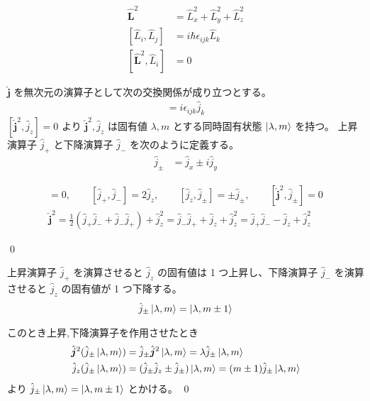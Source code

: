 \documentclass[uplatex,dvipdfmx,a4paper,11pt]{jlreq}
\makeatletter
\theoremstyle{definition}
\renewenvironment{proof}[1][\proofname]{\par
  \normalfont
  \topsep6\p@\@plus6\p@ \trivlist
  \item[\hskip\labelsep{\bfseries #1}\@addpunct{\bfseries}]\ignorespaces\quad\par
}{%
  \qed\endtrivlist\@endpefalse
}
\renewcommand\proofname{証明}
\makeatother
\begin{document}
\begin{proposition}
  \begin{align}
    \hat{\bm{L}}^2              & = \hat{L}_x^2 + \hat{L}_y^2 + \hat{L}_z^2 \\
    [\hat{L}_i, \hat{L}_j]      & = i\hbar\epsilon_{ijk}\hat{L}_k           \\
    [\hat{\bm{L}}^2, \hat{L}_i] & = 0
  \end{align}
\end{proposition}

\begin{definition}
  $\hat{\bm{j}}$ を無次元の演算子として次の交換関係が成り立つとする。
  \begin{align}
    [\hat{j}_i, \hat{j}_j] = i\epsilon_{ijk}\hat{j}_k
  \end{align}
  $[\hat{\bm{j}}^2, \hat{j}_z] = 0$ より $\hat{\bm{j}}^2, \hat{j}_z$ は固有値 $\lambda, m$ とする同時固有状態 $\ket{\lambda, m}$ を持つ。
  上昇演算子 $\hat{j}_+$ と下降演算子 $\hat{j}_-$ を次のように定義する。
  \begin{align}
    \hat{j}_\pm & = \hat{j}_x \pm i\hat{j}_y
  \end{align}
\end{definition}

\begin{proposition}
  \begin{align}
    [\hat{\bm{j}}^2, \hat{j}_z] = 0, \qquad [\hat{j}_+, \hat{j}_-] = 2\hat{j}_z, \qquad [\hat{j}_z, \hat{j}_\pm] = \pm \hat{j}_\pm, \qquad [\hat{\bm{j}}^2, \hat{j}_\pm] = 0 \\
    \hat{\bm{j}}^2 = \frac{1}{2}(\hat{j}_+\hat{j}_- + \hat{j}_-\hat{j}_+) + \hat{j}_z^2 = \hat{j}_-\hat{j}_+ + \hat{j}_z + \hat{j}_z^2 = \hat{j}_+\hat{j}_- - \hat{j}_z + \hat{j}_z^2
  \end{align}
\end{proposition}
\begin{proof}
\end{proof}

\begin{proposition}
  上昇演算子 $\hat{j}_+$ を演算させると $\hat{j}_z$ の固有値は 1 つ上昇し、下降演算子 $\hat{j}_-$ を演算させると $\hat{j}_z$ の固有値が 1 つ下降する。
  \begin{align}
    \hat{j}_\pm\ket{\lambda, m} = \ket{\lambda, m\pm 1}
  \end{align}
\end{proposition}
\begin{proof}
  このとき上昇,下降演算子を作用させたとき
  \begin{align}
    \hat{\bm{j}}^2(\hat{j}_\pm\ket{\lambda, m}) & = \hat{j}_\pm\hat{\bm{j}}^2\ket{\lambda, m} = \lambda \hat{j}_\pm\ket{\lambda, m}               \\
    \hat{j}_z(\hat{j}_\pm\ket{\lambda, m})      & = (\hat{j}_\pm \hat{j}_z \pm \hat{j}_\pm)\ket{\lambda, m} = (m\pm 1)\hat{j}_\pm\ket{\lambda, m}
  \end{align}
  より $\hat{j}_\pm\ket{\lambda, m} = \ket{\lambda, m\pm 1}$ とかける。
\end{proof}
\end{document}
